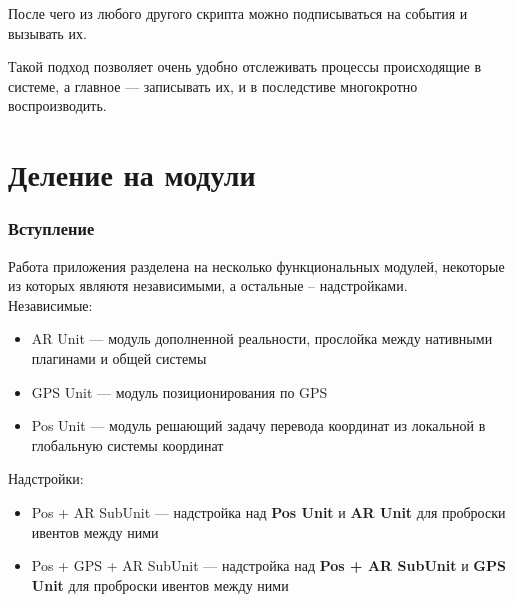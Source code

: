 \documentclass[a4paper, 11pt, titlepage]{article}
\begin{document}
  \lstset{style=sharpc}
  
  После чего из любого другого скрипта можно подписываться на события и вызывать их.
  
  Такой подход позволяет очень удобно отслеживать процессы происходящие в системе, а главное --- записывать их, и в 
  последстиве многокротно воспроизводить.

\part{Деление на модули}
  \section{Вступление}
    Работа приложения разделена на несколько функциональных модулей, некоторые из которых являютя независимыми, а остальные -- надстройками.\\
    Независимые:
    \begin{itemize}
    \item AR Unit --- модуль дополненной реальности, прослойка между нативными плагинами и общей системы
    \item GPS Unit --- модуль позиционирования по GPS
    \item Pos Unit --- модуль решающий задачу перевода координат из локальной в глобальную системы координат
    \end{itemize}
    Надстройки:
    \begin{itemize}
    \item Pos + AR SubUnit --- надстройка над \textbf{Pos Unit} и \textbf{AR Unit} для проброски ивентов между ними
    \item Pos + GPS + AR SubUnit --- надстройка над \textbf{Pos + AR SubUnit} и \textbf{GPS Unit} для проброски ивентов между ними
    \end{itemize}
\end{document}
